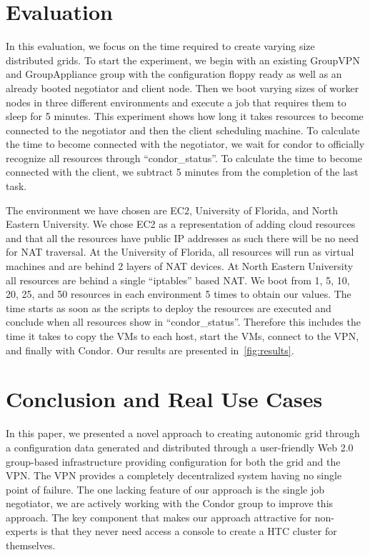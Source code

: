 \documentclass{sig-alternate}
\begin{document}
\section{Evaluation}
\label{evaluation}
In this evaluation, we focus on the time required to create varying size
distributed grids.  To start the experiment, we begin with an existing
GroupVPN and GroupAppliance group with the configuration floppy ready as well
as an already booted negotiator and client node.  Then we boot varying sizes of
worker nodes in three different environments and execute a job that requires
them to sleep for 5 minutes.  This experiment shows how long it takes resources
to become connected to the negotiator and then the client scheduling machine.
To calculate the time to become connected with the negotiator, we wait for
condor to officially recognize all resources through ``condor\_status''.  To
calculate the time to become connected with the client, we subtract 5 minutes
from the completion of the last task.

The environment we have chosen are EC2, University of Florida, and North
Eastern University.  We chose EC2 as a representation of adding cloud resources
and that all the resources have public IP addresses as such there will be no
need for NAT traversal.  At the University of Florida, all resources will run
as virtual machines and are behind 2 layers of NAT devices.  At North Eastern
University all resources are behind a single ``iptables'' based NAT.  We boot
from 1, 5, 10, 20, 25, and 50 resources in each environment 5 times to obtain
our values.  The time starts as soon as the scripts to deploy the resources
are executed and conclude when all resources show in ``condor\_status''.
Therefore this includes the time it takes to copy the VMs to each host, start
the VMs, connect to the VPN, and finally with Condor.  Our results are
presented in~\ref{fig:results}.

\section{Conclusion and Real Use Cases}
\label{conclusion}
In this paper, we presented a novel approach to creating autonomic grid through
a configuration data generated and distributed through a user-friendly Web 2.0
group-based infrastructure providing configuration for both the grid and the
VPN.  The VPN provides a completely decentralized system having no single point
of failure.  The one lacking feature of our approach is the single job
negotiator, we are actively working with the Condor group to improve this
approach.  The key component that makes our approach attractive for non-experts
is that they never need access a console to create a HTC cluster for themselves.
\end{document}
